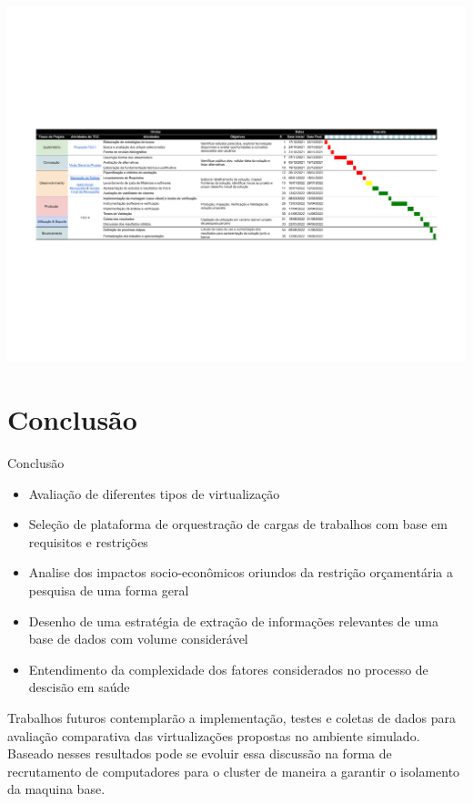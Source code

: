 \documentclass[10pt,brazil]{beamer}
\theoremstyle{definition}
\begin{document}
\begin{frame}[plain]
  \hspace*{-10mm}
  \includegraphics[width=\paperwidth]{TCC cronograma - Sheet1.pdf}
\end{frame}

\section{Conclusão}

\begin{frame}{Conclusão}
  \begin{itemize}
    \item Avaliação de diferentes tipos de virtualização
    \item Seleção de plataforma de orquestração de cargas de trabalhos com base em requisitos e restrições
    \item Analise dos impactos socio-econômicos oriundos da restrição orçamentária a pesquisa de uma forma geral
    \item Desenho de uma estratégia de extração de informações relevantes de uma base de dados com volume considerável
    \item Entendimento da complexidade dos fatores considerados no processo de descisão em saúde
  \end{itemize}
  Trabalhos futuros contemplarão a implementação, testes e coletas de dados para avaliação comparativa das virtualizações propostas no ambiente simulado. Baseado nesses resultados pode se evoluir essa discussão na forma de recrutamento de computadores para o cluster de maneira a garantir o isolamento da maquina base.
\end{frame}
\end{document}
